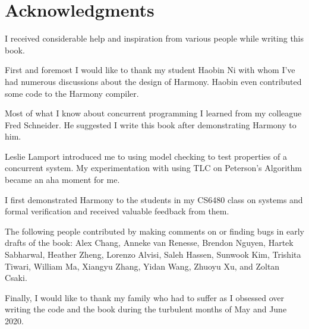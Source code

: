 \documentclass{report}
\begin{document}
\cleardoublepage
{}
{}
\chapter*{Acknowledgments}

I received considerable help and inspiration from various people
while writing this book.

First and foremost I would like to thank my student Haobin Ni with
whom I've had numerous discussions about the design of Harmony.
Haobin even contributed some code to the Harmony compiler.

Most of what I know about concurrent programming I learned from
my colleague Fred Schneider.  He suggested I write this book after
demonstrating Harmony to him.

Leslie Lamport introduced me to using model checking to test properties
of a concurrent system.  My experimentation with using TLC on Peterson's
Algorithm became an aha moment for me.

I first demonstrated Harmony to the students in my CS6480 class on systems
and formal verification and
received valuable feedback from them.

The following people contributed by making comments on or finding bugs in
early drafts of the book:
Alex Chang,
Anneke van Renesse,
Brendon Nguyen,
Hartek Sabharwal,
Heather Zheng,
Lorenzo Alvisi,
Saleh Hassen,
Sunwook Kim,
Trishita Tiwari,
William Ma,
Xiangyu Zhang,
Yidan Wang,
Zhuoyu Xu,
and
Zoltan Csaki.

Finally, I would like to thank my family who had to suffer as I obsessed
over writing the code and the book during the turbulent months of
May and June 2020.


\cleardoublepage
{}
\printindex

\cleardoublepage
{}
\printglossaries
\end{document}
